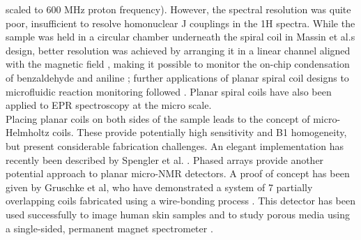scaled to 600 MHz proton frequency). However, the spectral resolution
was quite poor, insufficient to resolve homonuclear J couplings in the
1H spectra. While the sample was held in a circular chamber underneath
the spiral coil in Massin et al.s design, better resolution was achieved
by arranging it in a linear channel aligned with the magnetic field
\cite{Wensink:2004kd}, making it possible to monitor the on-chip
condensation of benzaldehyde and aniline \cite{wensink2005mrk}; further
applications of planar spiral coil designs to microfluidic reaction
monitoring followed \cite{Gomez:2010jr,Yue:2012fw}. Planar spiral coils
have also been applied to EPR spectroscopy \cite{Boero:2003hf} at the micro
scale.\\Placing planar coils on both sides of the sample leads to the
concept of micro-Helmholtz coils. These provide potentially high
sensitivity and B1 homogeneity, but present considerable fabrication
challenges. An elegant implementation has recently been described by
Spengler et al. \cite{Spengler:2014ir,Spengler:2016km}. Phased arrays
provide another potential approach to planar micro-NMR detectors. A
proof of concept has been given by Gruschke et al, who have demonstrated
a system of 7 partially overlapping coils fabricated using a
wire-bonding process \cite{Gruschke:2012df}. This detector has been used
successfully to image human skin samples \cite{Gobel:2014tf} and to study
porous media using a single-sided, permanent magnet spectrometer
\cite{Oligschlager:2015fl}.

